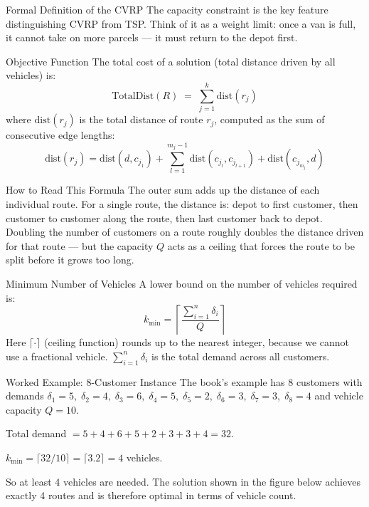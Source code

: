 \documentclass[aspectratio=169,10pt]{beamer}
\begin{document}
\begin{frame}[allowframebreaks]{Formal Definition of the CVRP}
  The capacity constraint is the key feature distinguishing CVRP from TSP.
  Think of it as a weight limit: once a van is full, it cannot take on more
  parcels --- it must return to the depot first.

  \framebreak

  \begin{block}{Objective Function}
    The total cost of a solution (total distance driven by all vehicles) is:
    \[
      \text{TotalDist}(R) \;=\;
      \sum_{j=1}^{k} \mathrm{dist}(r_j)
    \]
    where $\mathrm{dist}(r_j)$ is the total distance of route $r_j$, computed
    as the sum of consecutive edge lengths:
    \[
      \mathrm{dist}(r_j) =
      \mathrm{dist}(d, c_{j_1})
      + \sum_{l=1}^{m_j - 1} \mathrm{dist}(c_{j_l}, c_{j_{l+1}})
      + \mathrm{dist}(c_{j_{m_j}}, d)
    \]
  \end{block}

  \begin{alertblock}{How to Read This Formula}
    The outer sum adds up the distance of each individual route.  For a
    single route, the distance is: depot to first customer, then customer to
    customer along the route, then last customer back to depot.  Doubling the
    number of customers on a route roughly doubles the distance driven for
    that route --- but the capacity $Q$ acts as a ceiling that forces the route
    to be split before it grows too long.
  \end{alertblock}

  \framebreak

  \begin{block}{Minimum Number of Vehicles}
    A lower bound on the number of vehicles required is:
    \[
      k_{\min} = \left\lceil \frac{\sum_{i=1}^{n} \delta_i}{Q} \right\rceil
    \]
    Here $\lceil \cdot \rceil$ (ceiling function) rounds up to the nearest
    integer, because we cannot use a fractional vehicle.
    $\sum_{i=1}^{n} \delta_i$ is the total demand across all customers.
  \end{block}

  \begin{exampleblock}{Worked Example: 8-Customer Instance}
    The book's example has 8 customers with demands
    $\delta_1=5,\;\delta_2=4,\;\delta_3=6,\;\delta_4=5,\;\delta_5=2,\;\delta_6=3,\;\delta_7=3,\;\delta_8=4$
    and vehicle capacity $Q=10$.

    Total demand $= 5+4+6+5+2+3+3+4 = 32$.

    \medskip
    $k_{\min} = \lceil 32/10 \rceil = \lceil 3.2 \rceil = 4$ vehicles.

    \medskip
    So at least 4 vehicles are needed.  The solution shown in the figure below
    achieves exactly 4 routes and is therefore optimal in terms of vehicle count.
  \end{exampleblock}

\end{frame}
\end{document}
